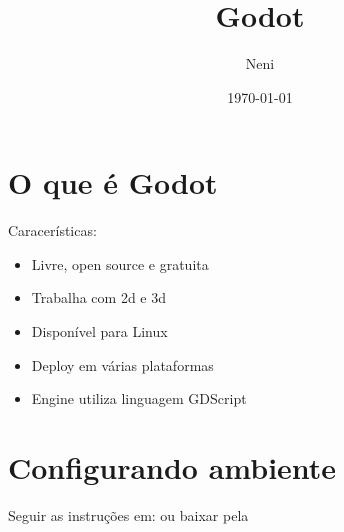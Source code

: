 \documentclass{apostila}
\title{Godot}
\author{Neni}
\date{\today}
\begin{document}
\chapter{O que é Godot}

    Caracerísticas:
    \begin{itemize}
        \item Livre, open source e gratuita
        \item Trabalha com 2d e 3d
        \item Disponível para Linux
        \item Deploy em várias plataformas
        \item Engine utiliza linguagem GDScript
    \end{itemize}

\chapter{Configurando ambiente}
Seguir as instruções em:  ou baixar pela 
\end{document}
